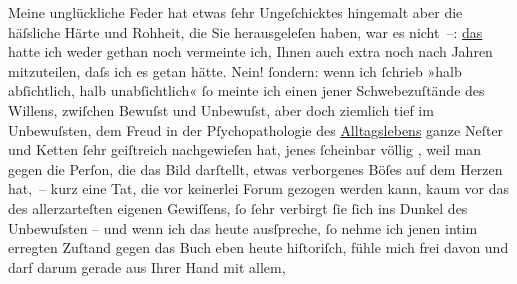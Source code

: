 \pstart
           Meine unglückliche  Feder hat etwas{ }ſehr
               Ungeſchicktes hingemalt aber die häſsliche Härte und Rohheit, die Sie herausgeleſen
               haben, war es nicht –: \uline{das} hatte ich weder gethan
               noch vermeinte ich, Ihnen auch extra noch nach {\pb}Jahren mitzuteilen, daſs ich es
               getan hätte. Nein!{ }ſondern: wenn ich{ }ſchrieb »halb abſichtlich, halb unabſichtlich«{ }ſo meinte ich einen jener Schwebezuſtände des Willens, zwiſchen Bewuſst und
               Unbewuſst, aber doch ziemlich tief im Unbewuſsten, dem Freud in der Pſychopathologie
                  des \uline{Alltagslebens} ganze Neſter und {\pb}Ketten{ }ſehr geiſtreich nachgewieſen hat, jenes{ }ſcheinbar völlig \label{K_L01978-1v}\label{K_L01978-1}, weil man
               gegen die Perſon, die das Bild darſtellt, etwas verborgenes Böſes auf dem Herzen
               hat, – kurz eine Tat, die vor keinerlei Forum gezogen werden kann, kaum vor das des
               allerzarteſten eigenen Gewiſſens,{ }ſo{ }ſehr verbirgt{ }ſie{ }{\pb}ſich ins Dunkel des Unbewuſsten –
               und wenn ich das heute ausſpreche,{ }ſo nehme ich jenen intim erregten Zuſtand gegen
               das Buch eben heute
               hiſtoriſch, fühle mich frei davon und darf darum gerade aus Ihrer Hand mit allem,
